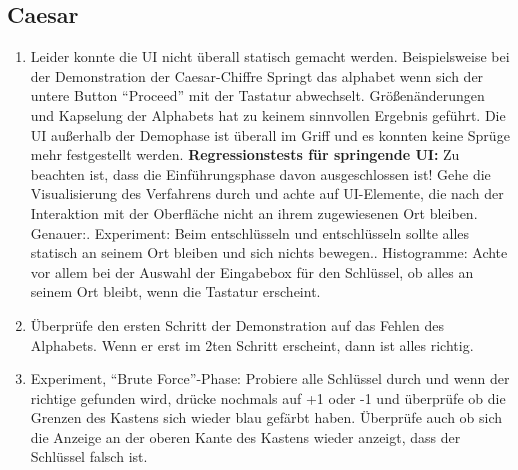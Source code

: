 \documentclass{article}
\begin{document}
 \subsection{Caesar}
  \begin{enumerate}
   \item Leider konnte die UI nicht überall statisch gemacht werden. Beispielsweise bei der Demonstration der Caesar-Chiffre 
         Springt das alphabet wenn sich der untere Button ``Proceed'' mit der Tastatur abwechselt. Größenänderungen und Kapselung der 
         Alphabets hat zu keinem sinnvollen Ergebnis geführt. Die UI außerhalb der Demophase ist überall im Griff und es konnten 
         keine Sprüge mehr festgestellt werden.\newline 
         \textbf{Regressionstests für springende UI:}\newline
         Zu beachten ist, dass die Einführungsphase davon ausgeschlossen ist!\newline
         Gehe die Visualisierung des Verfahrens durch und achte auf UI-Elemente, die nach der Interaktion mit der Oberfläche 
         nicht an ihrem zugewiesenen Ort bleiben. Genauer:. Experiment: Beim entschlüsseln und entschlüsseln sollte alles statisch an seinem Ort bleiben und sich nichts bewegen.. Histogramme: Achte vor allem bei der Auswahl der Eingabebox für den Schlüssel, ob alles an seinem Ort bleibt, wenn die
            Tastatur erscheint.
   \item Überprüfe den ersten Schritt der Demonstration auf das Fehlen des Alphabets. Wenn er erst im 2ten Schritt erscheint, dann ist
         alles richtig.
   \item Experiment, ``Brute Force''-Phase: Probiere alle Schlüssel durch und wenn der richtige gefunden wird, drücke nochmals auf +1 oder -1
         und überprüfe ob die Grenzen des Kastens sich wieder blau gefärbt haben. Überprüfe auch ob sich die Anzeige an der oberen Kante
         des Kastens wieder anzeigt, dass der Schlüssel falsch ist.     
  \end{enumerate}
\end{document}
